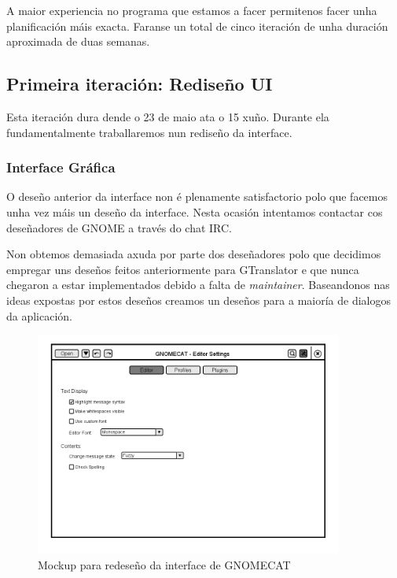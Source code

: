 A maior experiencia no programa que estamos a facer permitenos facer unha planificación máis exacta. Faranse un total de cinco iteración de unha duración aproximada de duas semanas. 



\subsection{Primeira iteración: Rediseño UI}

Esta iteración dura dende o 23 de maio ata o 15 xuño. Durante ela fundamentalmente traballaremos nun rediseño da interface.

\subsubsection{Interface Gráfica}
O deseño anterior da interface non é plenamente satisfactorio polo que facemos unha vez máis un deseño da interface. Nesta ocasión intentamos contactar cos deseñadores de GNOME a través do chat IRC. 

Non obtemos demasiada axuda por parte dos deseñadores polo que decidimos empregar uns deseños feitos anteriormente para GTranslator e que nunca chegaron a estar implementados debido a falta de \emph{maintainer}. Baseandonos nas ideas expostas por estos deseños creamos un deseños para a maioría de dialogos da aplicación.

\begin{figure}[h!]
    \centering
    \includegraphics[width=0.9\textwidth]{img/gsoc2_it1_mockup.png} 
    \caption{Mockup para redeseño da interface de GNOMECAT}
    \label{fig:gsoc2_it1_mockup}
\end{figure}


